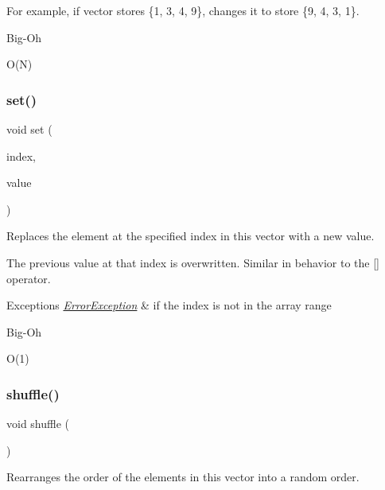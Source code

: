 For example, if vector stores \{1, 3, 4, 9\}, changes it to store \{9, 4, 3, 1\}. \begin{DoxyRefDesc}{Big-\/\+Oh}
\item[\mbox{\hyperlink{BigOh__BigOh000130}{Big-\/\+Oh}}]O(\+N) \end{DoxyRefDesc}
\mbox{\label{classVector_a004ea6d6bc4a512ce4d52962727d5db2}} 
\subsubsection{\texorpdfstring{set()}{set()}}
{\footnotesize\ttfamily void set (\begin{DoxyParamCaption}\item[{int}]{index,  }\item[{const Value\+Type \&}]{value }\end{DoxyParamCaption})}



Replaces the element at the specified index in this vector with a new value. 

The previous value at that index is overwritten. Similar in behavior to the \mbox{[}\mbox{]} operator. 
\begin{DoxyExceptions}{Exceptions}
{\em \mbox{\hyperlink{classErrorException}{Error\+Exception}}} & if the index is not in the array range \\
\hline
\end{DoxyExceptions}
\begin{DoxyRefDesc}{Big-\/\+Oh}
\item[\mbox{\hyperlink{BigOh__BigOh000131}{Big-\/\+Oh}}]O(1) \end{DoxyRefDesc}
\mbox{\label{classVector_a1905fe84eb39f020b32c58baf7a76758}} 
\subsubsection{\texorpdfstring{shuffle()}{shuffle()}}
{\footnotesize\ttfamily void shuffle (\begin{DoxyParamCaption}{ }\end{DoxyParamCaption})}



Rearranges the order of the elements in this vector into a random order. 

